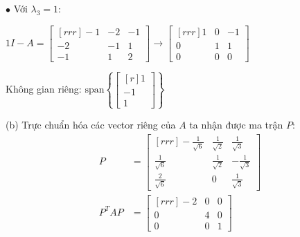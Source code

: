 \documentclass{article}
\newcommand\ddfrac[2]{\frac{\displaystyle #1}{\displaystyle #2}}
\begin{document}
    \begin{minipage}{0.48\linewidth}

    $\bullet$ Với $ \lambda _3 = 1$:

    $ 1I - A = \begin{bmatrix}[rrr]
        -1 & -2 & -1 \\
        -2 & -1 & 1 \\
        -1 & 1 & 2 
    \end{bmatrix} \to \begin{bmatrix}[rrr]
        1 & 0 & -1 \\
        0 & 1 & 1 \\
        0 & 0 & 0 
    \end{bmatrix} $

    Không gian riêng: $\text{span} \left\{ \begin{bmatrix}[r]
        1 \\
        -1 \\
        1 
    \end{bmatrix}  \right\}$

    (b) Trực chuẩn hóa các vector riêng của $A$ ta nhận được ma trận $P$:
    \begin{equation*}
        \begin{split}
            P &= \begin{bmatrix}[rrr]
                -\ddfrac{1}{\sqrt{6}} & \ddfrac{1}{\sqrt{2}} & \ddfrac{1}{\sqrt{3}} \\
                \ddfrac{1}{\sqrt{6}} & \ddfrac{1}{\sqrt{2}} & - \ddfrac{1}{\sqrt{3}} \\
                \ddfrac{2}{\sqrt{6}} & 0 & \ddfrac{1}{\sqrt{3}} 
            \end{bmatrix} \\
                P^TAP &= \begin{bmatrix}[rrr]
                    -2 & 0 & 0 \\
                    0 & 4 & 0 \\
                    0 & 0 & 1 
                \end{bmatrix} 
        \end{split}
    \end{equation*}

        
    \end{minipage}
    
\end{document}
